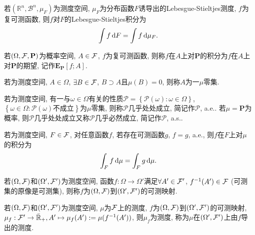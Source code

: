 \begin{definition}
    若$(\mathbb{R}^n,{\mathscr{B}}^n,\mu_F)$为测度空间, $\mu_F$为分布函数$F$诱导出的Lebesgue-Stieltjes测度, $f$为复可测函数, 则$f$对$F$的Lebesgue-Stieltjes积分为
    \begin{equation}
        \int f\,\mathrm{d} F=\int f\,\mathrm{d} \mu_F.
    \end{equation}
\end{definition}

\begin{definition}
    若$(\Omega,\mathcal{F},\mathbf{P})$为概率空间, $A\in\mathcal{F}$, $f$为复可测函数, 则称$f$在$A$上对$\mathbf{P}$的积分为$f$在$A$上对$\mathbf{P}$的期望, 记作$\mathbf{E}_{\mathbf{P}}[f;A]$.
\end{definition}

\begin{definition}
    若\s{}为测度空间, $A\in\Omega$, $\exists  B\in\mathcal{F}$, $B\supset A$且$\mu(B)=0$, 则称$A$为一$\mu$零集.
\end{definition}

\begin{definition}
    若\s{}为测度空间, 有一与$\omega\in\Omega$有关的性质$\mathscr{P}=\left\{\mathscr{P}(\omega):\omega\in\Omega\right\}$, $\left\{\omega\in\Omega:\mathscr{P}(\omega)\text{不成立}\right\}$为$\mu$零集, 则称$\mathscr{P}$几乎处处成立, 简记作$\mathscr{P}$, a.e.. 若$\mu=\mathbf{P}$为概率, 则$\mathscr{P}$几乎处处成立又称$\mathscr{P}$几乎必然成立, 简记作$\mathscr{P}$, a.s..
\end{definition}

\begin{definition}
    若\s{}为测度空间, $F\in\mathcal{F}$, 对任意函数$f$, 若存在可测函数$g$, $f=g$, a.e., 则$f$在$F$上对$\mu$的积分为
    \begin{equation}
        \int_{F}f\,\mathrm{d}\mu=\int_{F}g\,\mathrm{d}\mu.
    \end{equation}
\end{definition}

\begin{definition}
    若$(\Omega,\mathcal{F})$和$(\Omega',\mathcal{F}')$为测度空间, 函数$f:\Omega\to\Omega'$满足$\forall A' \in \mathcal{F}'$, $f^{-1}(A')\in\mathcal{F}$ (可测集的原像是可测集), 则称$f$为$(\Omega,\mathcal{F})$到$(\Omega',\mathcal{F}')$的可测映射.
\end{definition}

\begin{definition}
    若$(\Omega,\mathcal{F})$和$(\Omega',\mathcal{F}')$为测度空间, $\mu$为$\mathcal{F}$上的测度, $f$为$(\Omega,\mathcal{F})$到$(\Omega',\mathcal{F}')$的可测映射, $\mu_f:\mathcal{F}'\to \bar{\mathbb{R}}_+,A'\mapsto\mu_f(A'):=\mu(f^{-1}(A'))$, 则$\mu_f$为测度, 称为$\mu$在$(\Omega',\mathcal{F}')$上由$f$导出的测度.
\end{definition}

